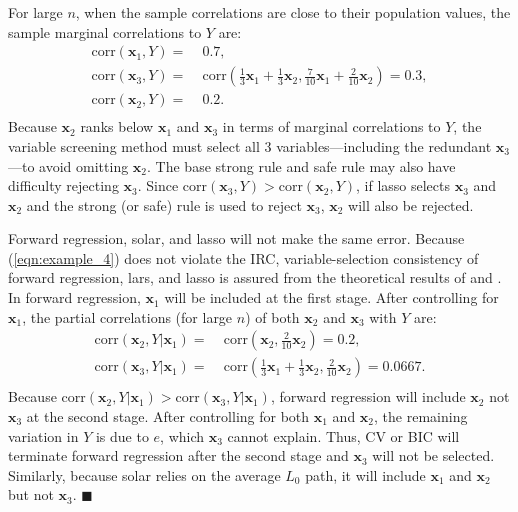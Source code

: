 \documentclass[11pt,review,authoryear]{elsarticle}
\begin{document}
For large $n$, when the sample correlations are close to their population values, the sample marginal correlations to $Y$ are:
%
\begin{equation}
  \begin{aligned}
    \mathrm{corr} \left( \mathbf{x}_1, Y \right)  = & \;0.7, \\
    \mathrm{corr} \left( \mathbf{x}_3, Y \right)  = & \;\mathrm{corr} \left( \frac{1}{3} \mathbf{x}_1 + \frac{1}{3} \mathbf{x}_2, \frac{7}{10} \mathbf{x}_1 +  \frac{2}{10} \mathbf{x}_2 \right)
    = 0.3, \\
    \mathrm{corr} \left( \mathbf{x}_2, Y \right)  = & \;0.2. \\
  \end{aligned}
\end{equation}
%
Because $\mathbf{x}_2$ ranks below $\mathbf{x}_1$ and $\mathbf{x}_3$ in terms of marginal correlations to $Y$, the variable screening method must select all $3$ variables---including the redundant $\mathbf{x}_3$---to avoid omitting $\mathbf{x}_2$. The base strong rule and safe rule may also have difficulty rejecting $\mathbf{x}_3$. Since $\mathrm{corr} \left( \mathbf{x}_3, Y \right)>\mathrm{corr} \left( \mathbf{x}_2, Y \right)$, if lasso selects $\mathbf{x}_3$ and $\mathbf{x}_2$ and the strong (or safe) rule is used to reject $\mathbf{x}_3$, $\mathbf{x}_2$ will also be rejected.

Forward regression, solar, and lasso will not make the same error. Because (\ref{eqn:example_4}) does not violate the IRC, variable-selection consistency of forward regression, lars, and lasso is assured from the theoretical results of \citet{zhang09} and \citet{zhaoyu06}. In forward regression, $\mathbf{x}_1$ will be included  at the first stage. After controlling for $\mathbf{x}_1$, the partial correlations (for large $n$) of both $\mathbf{x}_2$ and $\mathbf{x}_3$ with $Y$ are:
%
\begin{equation}
  \begin{aligned}
    \mathrm{corr} \left( \mathbf{x}_2, Y \vert \mathbf{x}_1 \right)  = & \;\mathrm{corr} \left( \mathbf{x}_2, \frac{2}{10} \mathbf{x}_2 \right)
    = 0.2, \\
    \mathrm{corr} \left( \mathbf{x}_3, Y \vert \mathbf{x}_1 \right)  = & \;\mathrm{corr} \left( \frac{1}{3} \mathbf{x}_1 + \frac{1}{3} \mathbf{x}_2, \frac{2}{10} \mathbf{x}_2 \right)
    = 0.0667. \\
  \end{aligned}
\end{equation}
%
Because $\mathrm{corr}(\mathbf{x}_2, Y \vert \mathbf{x}_1)>\mathrm{corr}(\mathbf{x}_3, Y \vert \mathbf{x}_1)$, forward regression will include $\mathbf{x}_2$ not $\mathbf{x}_3$ at the second stage. After controlling for both $\mathbf{x}_1$ and $\mathbf{x}_2$, the remaining variation in $Y$ is due to $e$, which $\mathbf{x}_3$ cannot explain. Thus, CV or BIC will terminate forward regression after the second stage and $\mathbf{x}_3$ will not be selected. Similarly, because solar relies on the average $L_0$ path, it will include $\mathbf{x}_1$ and $\mathbf{x}_2$ but not $\mathbf{x}_3$. $\blacksquare$
\end{document}
